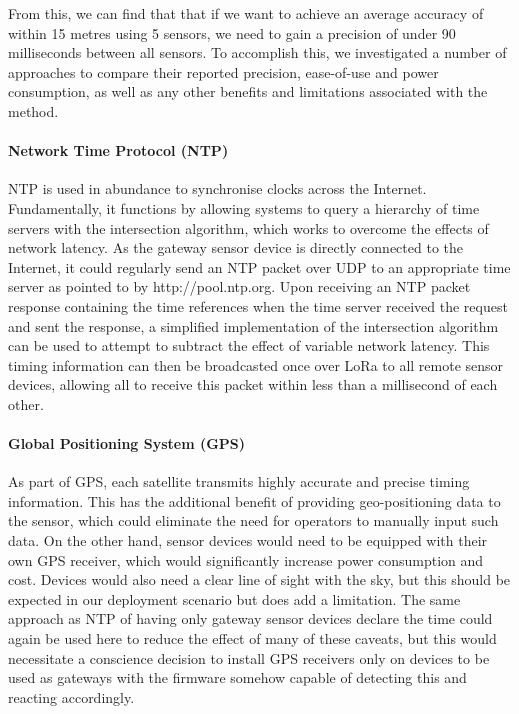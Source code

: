 \documentclass[conference]{IEEEtran}
\begin{document}
From this, we can find that that if we want to achieve an average accuracy of within 15 metres using 5 sensors, we need to gain a precision of under 90 milliseconds between all sensors. To accomplish this, we investigated a number of approaches to compare their reported precision, ease-of-use and power consumption, as well as any other benefits and limitations associated with the method\cite{sync-methods}.

\paragraph{Network Time Protocol (NTP)} NTP is used in abundance to synchronise clocks across the Internet. Fundamentally, it functions by allowing systems to query a hierarchy of time servers with the intersection algorithm, which works to overcome the effects of network latency\cite{rfc1305}. As the gateway sensor device is directly connected to the Internet, it could regularly send an NTP packet over UDP to an appropriate time server as pointed to by http://pool.ntp.org. Upon receiving an NTP packet response containing the time references when the time server received the request and sent the response, a simplified implementation of the intersection algorithm can be used to attempt to subtract the effect of variable network latency. This timing information can then be broadcasted once over LoRa to all remote sensor devices, allowing all to receive this packet within less than a millisecond of each other.

\paragraph{Global Positioning System (GPS)} As part of GPS, each satellite transmits highly accurate and precise timing information. This has the additional benefit of providing geo-positioning data to the sensor, which could eliminate the need for operators to manually input such data. On the other hand, sensor devices would need to be equipped with their own GPS receiver, which would significantly increase power consumption and cost. Devices would also need a clear line of sight with the sky, but this should be expected in our deployment scenario but does add a limitation. The same approach as NTP of having only gateway sensor devices declare the time could again be used here to reduce the effect of many of these caveats, but this would necessitate a conscience decision to install GPS receivers only on devices to be used as gateways with the firmware somehow capable of detecting this and reacting accordingly.
\end{document}
